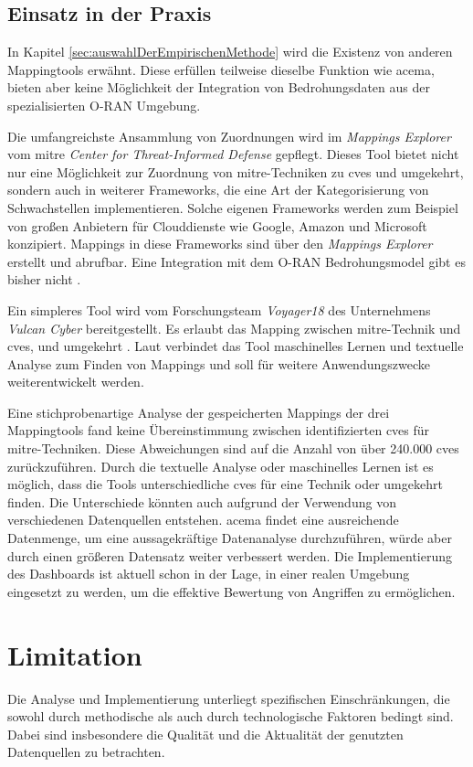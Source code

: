 \subsection{Einsatz in der Praxis}
In Kapitel \ref{sec:auswahlDerEmpirischenMethode} wird die Existenz von anderen Mappingtools erwähnt. Diese erfüllen teilweise dieselbe Funktion wie \gls{acema}, bieten aber keine Möglichkeit der Integration von Bedrohungsdaten aus der spezialisierten O-RAN Umgebung.
\par Die umfangreichste Ansammlung von Zuordnungen wird im \textit{Mappings Explorer} vom \gls{mitre} \textit{Center for Threat-Informed Defense} gepflegt. Dieses Tool bietet nicht nur eine Möglichkeit zur Zuordnung von \gls{mitre}-Techniken zu \glspl{cve} und umgekehrt, sondern auch in weiterer Frameworks, die eine Art der Kategorisierung von Schwachstellen implementieren. Solche eigenen Frameworks werden zum Beispiel von großen Anbietern für Clouddienste wie Google, Amazon und Microsoft konzipiert. Mappings in diese Frameworks sind über den \textit{Mappings Explorer} erstellt und abrufbar. Eine Integration mit dem O-RAN Bedrohungsmodel gibt es bisher nicht \autocite{HomeMappingsExplorer}.
\par Ein simpleres Tool wird vom Forschungsteam \textit{Voyager18} des Unternehmens \textit{Vulcan Cyber} bereitgestellt. Es erlaubt das Mapping zwischen \gls{mitre}-Technik und \glspl{cve}, und umgekehrt \autocite{Vulcan}. Laut \autocite{keizmanMITREATTCKFramework2022} verbindet das Tool maschinelles Lernen und textuelle Analyse zum Finden von Mappings und soll für weitere Anwendungszwecke weiterentwickelt werden.
\par Eine stichprobenartige Analyse der gespeicherten Mappings der drei Mappingtools fand keine Übereinstimmung zwischen identifizierten \glspl{cve} für \gls{mitre}-Techniken. Diese Abweichungen sind auf die Anzahl von über 240.000 \glspl{cve} zurückzuführen. Durch die textuelle Analyse oder maschinelles Lernen ist es möglich, dass die Tools unterschiedliche \glspl{cve} für eine Technik oder umgekehrt finden. Die Unterschiede könnten auch aufgrund der Verwendung von verschiedenen Datenquellen entstehen.
\gls{acema} findet eine ausreichende Datenmenge, um eine aussagekräftige Datenanalyse durchzuführen, würde aber durch einen größeren Datensatz weiter verbessert werden. Die Implementierung des Dashboards ist aktuell schon in der Lage, in einer realen Umgebung eingesetzt zu werden, um die effektive Bewertung von Angriffen zu ermöglichen.

\section{Limitation}
\label{sec:limitationen}
Die Analyse und Implementierung unterliegt spezifischen Einschränkungen, die sowohl durch methodische als auch durch technologische Faktoren bedingt sind. Dabei sind insbesondere die Qualität und die Aktualität der genutzten Datenquellen zu betrachten.
